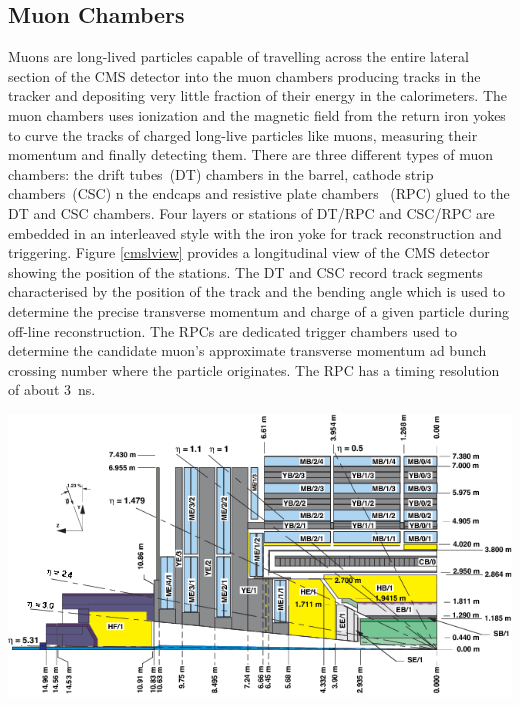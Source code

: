 \subsection{Muon Chambers}
Muons are long-lived particles capable of travelling across the entire lateral section of the CMS detector into the muon chambers producing tracks in the tracker and depositing very little fraction of their energy in the calorimeters. The muon chambers uses ionization and the magnetic field from the return iron yokes to curve the tracks of charged long-live particles like muons, measuring their momentum and finally detecting them. There are three different types of muon chambers: the drift tubes~(DT) chambers in the barrel, cathode strip chambers~(CSC) n the endcaps and resistive plate chambers ~(RPC) glued to the DT and CSC chambers. Four layers or stations of DT/RPC and CSC/RPC are embedded in an interleaved  style with the iron yoke for track reconstruction and triggering. Figure \eqref{cmslview} provides a longitudinal view of the CMS detector showing the position of the stations.
The DT and CSC record track segments characterised by the position of the track and the bending angle which is used to determine the precise transverse momentum and charge of a given particle during off-line reconstruction. The RPCs are dedicated trigger chambers used to determine the candidate muon's approximate transverse momentum ad bunch crossing number where the particle originates. The RPC has a timing resolution of about 3~ns.

\begin{center}\label{CMS-SUBD}
\centering
\mbox{\includegraphics[scale=0.6]{THESISPLOTS/CMS_Int_View.png}} 
\label{fig:cmslview.}
\end{center}

